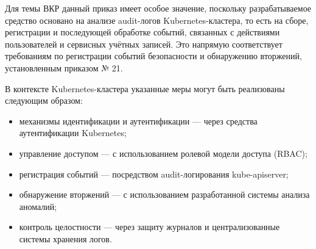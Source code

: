 Для темы ВКР данный приказ имеет особое значение, поскольку разрабатываемое средство основано на анализе audit-логов Kubernetes-кластера, то есть на сборе, регистрации и последующей обработке событий, связанных с действиями пользователей и сервисных учётных записей. Это напрямую соответствует требованиям по регистрации событий безопасности и обнаружению вторжений, установленным приказом № 21.

В контексте Kubernetes-кластера указанные меры могут быть реализованы следующим образом:
\begin{itemize}
    \item механизмы идентификации и аутентификации — через средства аутентификации Kubernetes;
    \item управление доступом — с использованием ролевой модели доступа (RBAC);
    \item регистрация событий — посредством audit-логирования kube-apiserver;
    \item обнаружение вторжений — с использованием разработанной системы анализа аномалий;
    \item контроль целостности — через защиту журналов и централизованные системы хранения логов.
\end{itemize}